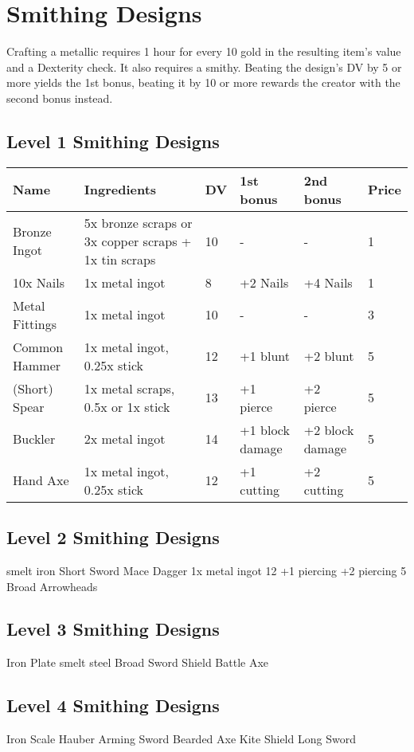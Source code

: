 \section{Smithing Designs}
Crafting a metallic requires 1 hour for every 10 gold in the resulting item's value and a Dexterity check. It also requires a smithy. Beating the design's DV by 5 or more yields the 1st bonus, beating it by 10 or more rewards the creator with the second bonus instead.\\

\subsection{Level 1 Smithing Designs}
\begin{longtable}{p{1.5cm} | p{2.5cm} | l | p{2cm} | p{2cm} | p{1cm} }
	Name & Ingredients & DV  & 1st bonus & 2nd bonus & Price\\ \hline
	Bronze Ingot & 5x bronze scraps or 3x copper scraps + 1x tin scraps & 10 & - & - & 1\\
	10x Nails & 1x metal ingot & 8 & +2 Nails & +4 Nails & 1\\
	Metal Fittings & 1x metal ingot & 10 & - & - & 3\\
	Common Hammer & 1x metal ingot, 0.25x stick & 12 & +1 blunt & +2 blunt & 5\\
	(Short) Spear & 1x metal scraps, 0.5x or 1x stick & 13 & +1 pierce & +2 pierce & 5\\
	Buckler & 2x metal ingot & 14 & +1 block damage & +2 block damage & 5\\
	Hand Axe & 1x metal ingot, 0.25x stick & 12 & +1 cutting & +2 cutting & 5\\
\end{longtable}


\subsection{Level 2 Smithing Designs}
smelt iron
Short Sword
Mace
Dagger  1x metal ingot  12  +1 piercing  +2 piercing  5\\
Broad Arrowheads


\subsection{Level 3 Smithing Designs}
Iron Plate
smelt steel
Broad Sword
Shield
Battle Axe


\subsection{Level 4 Smithing Designs}
Iron Scale Hauber
Arming Sword
Bearded Axe
Kite Shield
Long Sword


